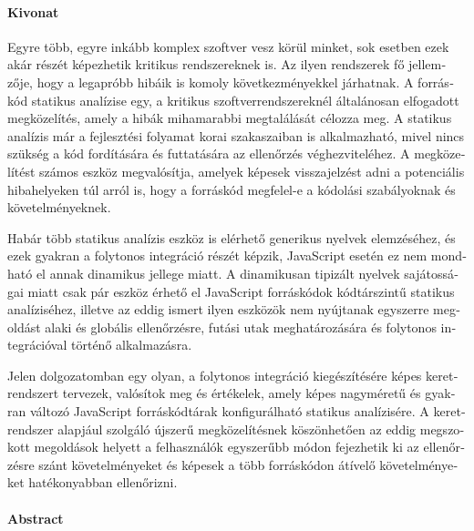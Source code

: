 \begin{otherlanguage}{magyar}

  \paragraph*{Kivonat}
  \thispagestyle{plain}
  {
  \selecthungarian

  Egyre több, egyre inkább komplex szoftver vesz körül minket, sok esetben ezek akár részét képezhetik kritikus rendszereknek is. Az ilyen rendszerek fő jellemzője, hogy a legapróbb hibáik is komoly következményekkel járhatnak. A forráskód statikus analízise egy, a kritikus szoftverrendszereknél általánosan elfogadott megközelítés, amely a hibák mihamarabbi megtalálását célozza meg. A statikus analízis már a fejlesztési folyamat korai szakaszaiban is alkalmazható, mivel nincs szükség a kód fordítására és futtatására az ellenőrzés véghezviteléhez. A megközelítést számos eszköz megvalósítja, amelyek képesek visszajelzést adni a potenciális hibahelyeken túl arról is, hogy a forráskód megfelel-e a kódolási szabályoknak és követelményeknek.

  Habár több statikus analízis eszköz is elérhető generikus nyelvek elemzéséhez, és ezek gyakran a folytonos integráció részét képzik, JavaScript esetén ez nem mondható el annak dinamikus jellege miatt. A dinamikusan tipizált nyelvek sajátosságai miatt csak pár eszköz érhető el JavaScript forráskódok kódtárszintű statikus analíziséhez, illetve az eddig ismert ilyen eszközök nem nyújtanak egyszerre megoldást alaki és globális ellenőrzésre, futási utak meghatározására és folytonos integrációval történő alkalmazásra.

  Jelen dolgozatomban egy olyan, a folytonos integráció kiegészítésére képes keretrendszert tervezek, valósítok meg és értékelek, amely képes nagyméretű és gyakran változó JavaScript forráskódtárak konfigurálható statikus analízisére. A keretrendszer alapjául szolgáló újszerű megközelítésnek köszönhetően az eddig megszokott megoldások helyett a felhasználók egyszerűbb módon fejezhetik ki az ellenőrzésre szánt követelményeket és képesek a több forráskódon átívelő követelményeket hatékonyabban ellenőrizni.

  }

\end{otherlanguage}

\cleardoublepage

\paragraph*{Abstract}
{}
\thispagestyle{plain}

